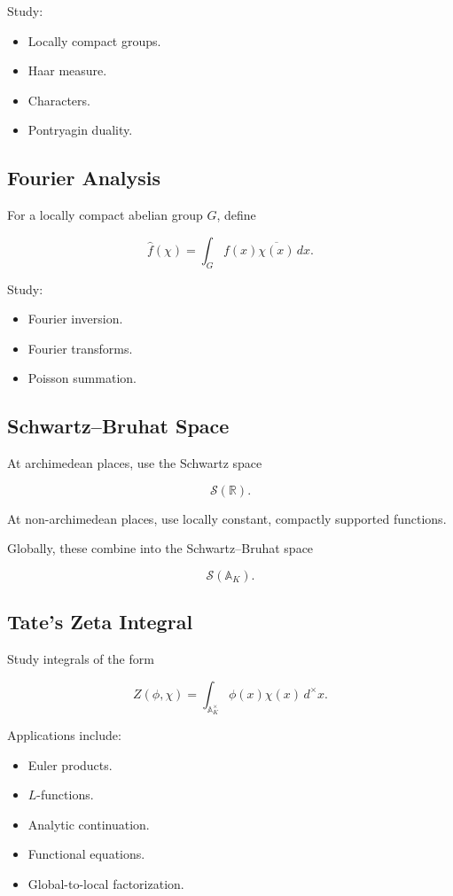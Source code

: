 \documentclass[11pt]{article}
\begin{document}
Study:

\begin{itemize}
    \item Locally compact groups.
    \item Haar measure.
    \item Characters.
    \item Pontryagin duality.
\end{itemize}

\subsection{Fourier Analysis}

For a locally compact abelian group $G$, define

\[
\widehat{f}(\chi)
=
\int_G
f(x)\overline{\chi(x)}\,dx.
\]

Study:

\begin{itemize}
    \item Fourier inversion.
    \item Fourier transforms.
    \item Poisson summation.
\end{itemize}

\subsection{Schwartz--Bruhat Space}

At archimedean places, use the Schwartz space

\[
\mathcal{S}(\mathbb{R}).
\]

At non-archimedean places, use locally constant,
compactly supported functions.

Globally, these combine into the
Schwartz--Bruhat space

\[
\mathcal{S}(\mathbb{A}_K).
\]

\subsection{Tate's Zeta Integral}

Study integrals of the form

\[
Z(\phi,\chi)
=
\int_{\mathbb{A}_K^\times}
\phi(x)\chi(x)\,d^\times x.
\]

Applications include:

\begin{itemize}
    \item Euler products.
    \item $L$-functions.
    \item Analytic continuation.
    \item Functional equations.
    \item Global-to-local factorization.
\end{itemize}
\end{document}
